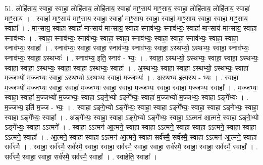 \documentclass[17pt]{extarticle}
\begin{document}
51. लोहि॑ताय॒ स्वाहा॒ स्वाहा॒ लोहि॑ताय॒ लोहि॑ताय॒ स्वाहा॑ माꣳ॒॒साय॑ माꣳ॒॒साय॒ स्वाहा॒ लोहि॑ताय॒ लोहि॑ताय॒ स्वाहा॑ माꣳ॒॒साय॑ । . स्वाहा॑ माꣳ॒॒साय॑ माꣳ॒॒साय॒ स्वाहा॒ स्वाहा॑ माꣳ॒॒साय॒ स्वाहा॒ स्वाहा॑ माꣳ॒॒साय॒ स्वाहा॒ स्वाहा॑ माꣳ॒॒साय॒ स्वाहा᳚ । . माꣳ॒॒साय॒ स्वाहा॒ स्वाहा॑ माꣳ॒॒साय॑ माꣳ॒॒साय॒ स्वाहा॒ स्नाव॑भ्यः॒ स्नाव॑भ्यः॒ स्वाहा॑ माꣳ॒॒साय॑ माꣳ॒॒साय॒ स्वाहा॒ स्नाव॑भ्यः । . स्वाहा॒ स्नाव॑भ्यः॒ स्नाव॑भ्यः॒ स्वाहा॒ स्वाहा॒ स्नाव॑भ्यः॒ स्वाहा॒ स्वाहा॒ स्नाव॑भ्यः॒ स्वाहा॒ स्वाहा॒ स्नाव॑भ्यः॒ स्वाहा᳚ । . स्नाव॑भ्यः॒ स्वाहा॒ स्वाहा॒ स्नाव॑भ्यः॒ स्नाव॑भ्यः॒ स्वाहा॒ ऽस्थभ्यो॒ ऽस्थभ्यः॒ स्वाहा॒ स्नाव॑भ्यः॒ स्नाव॑भ्यः॒ स्वाहा॒ ऽस्थभ्यः॑ । . स्नाव॑भ्य॒ इति॒ स्नाव॑ - भ्यः॒ । . स्वाहा॒ ऽस्थभ्यो॒ ऽस्थभ्यः॒ स्वाहा॒ स्वाहा॒ ऽस्थभ्यः॒ स्वाहा॒ स्वाहा॒ ऽस्थभ्यः॒ स्वाहा॒ स्वाहा॒ ऽस्थभ्यः॒ स्वाहा᳚ । . अ॒स्थभ्यः॒ स्वाहा॒ स्वाहा॒ ऽस्थभ्यो॒ ऽस्थभ्यः॒ स्वाहा॑ म॒ज्जभ्यो॑ म॒ज्जभ्यः॒ स्वाहा॒ ऽस्थभ्यो॒ ऽस्थभ्यः॒ स्वाहा॑ म॒ज्जभ्यः॑ । . अ॒स्थभ्य॒ इत्य॒स्थ - भ्यः॒ । . स्वाहा॑ म॒ज्जभ्यो॑ म॒ज्जभ्यः॒ स्वाहा॒ स्वाहा॑ म॒ज्जभ्यः॒ स्वाहा॒ स्वाहा॑ म॒ज्जभ्यः॒ स्वाहा॒ स्वाहा॑ म॒ज्जभ्यः॒ स्वाहा᳚ । . म॒ज्जभ्यः॒ स्वाहा॒ स्वाहा॑ म॒ज्जभ्यो॑ म॒ज्जभ्यः॒ स्वाहा ऽङ्गे॒भ्यो ऽङ्गे᳚भ्यः॒ स्वाहा॑ म॒ज्जभ्यो॑ म॒ज्जभ्यः॒ स्वाहा ऽङ्गे᳚भ्यः । . म॒ज्जभ्य॒ इति॑ म॒ज्ज - भ्यः॒ । . स्वाहा ऽङ्गे॒भ्यो ऽङ्गे᳚भ्यः॒ स्वाहा॒ स्वाहा ऽङ्गे᳚भ्यः॒ स्वाहा॒ स्वाहा ऽङ्गे᳚भ्यः॒ स्वाहा॒ स्वाहा ऽङ्गे᳚भ्यः॒ स्वाहा᳚ । . अङ्गे᳚भ्यः॒ स्वाहा॒ स्वाहा ऽङ्गे॒भ्यो ऽङ्गे᳚भ्यः॒ स्वाहा॒ ऽऽत्मन॑ आ॒त्मने॒ स्वाहा ऽङ्गे॒भ्यो ऽङ्गे᳚भ्यः॒ स्वाहा॒ ऽऽत्मने᳚ । . स्वाहा॒ ऽऽत्मन॑ आ॒त्मने॒ स्वाहा॒ स्वाहा॒ ऽऽत्मने॒ स्वाहा॒ स्वाहा॒ ऽऽत्मने॒ स्वाहा॒ स्वाहा॒ ऽऽत्मने॒ स्वाहा᳚ । . आ॒त्मने॒ स्वाहा॒ स्वाहा॒ ऽऽत्मन॑ आ॒त्मने॒ स्वाहा॒ सर्व॑स्मै॒ सर्व॑स्मै॒ स्वाहा॒ ऽऽत्मन॑ आ॒त्मने॒ स्वाहा॒ सर्व॑स्मै । . स्वाहा॒ सर्व॑स्मै॒ सर्व॑स्मै॒ स्वाहा॒ स्वाहा॒ सर्व॑स्मै॒ स्वाहा॒ स्वाहा॒ सर्व॑स्मै॒ स्वाहा॒ स्वाहा॒ सर्व॑स्मै॒ स्वाहा᳚ । . सर्व॑स्मै॒ स्वाहा॒ स्वाहा॒ सर्व॑स्मै॒ सर्व॑स्मै॒ स्वाहा᳚ । . स्वाहेति॒ स्वाहा᳚ । \newline
\pagebreak
{}
\end{document}
